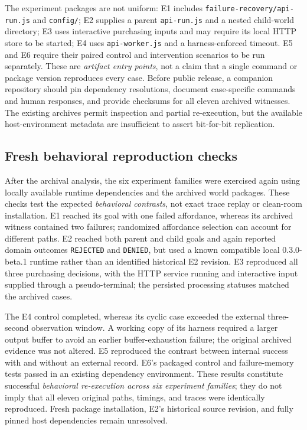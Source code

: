 \documentclass[11pt]{article}
\begin{document}
The experiment packages are not uniform: E1 includes \texttt{failure-recovery/api-run.js} and \texttt{config/}; E2 supplies a parent \texttt{api-run.js} and a nested child-world directory; E3 uses interactive purchasing inputs and may require its local HTTP store to be started; E4 uses \texttt{api-worker.js} and a harness-enforced timeout. E5 and E6 require their paired control and intervention scenarios to be run separately. These are \emph{artifact entry points}, not a claim that a single command or package version reproduces every case. Before public release, a companion repository should pin dependency resolutions, document case-specific commands and human responses, and provide checksums for all eleven archived witnesses. The existing archives permit inspection and partial re-execution, but the available host-environment metadata are insufficient to assert bit-for-bit replication.

\subsection{Fresh behavioral reproduction checks}
After the archival analysis, the six experiment families were exercised again using locally available runtime dependencies and the archived world packages. These checks test the expected \emph{behavioral contrasts}, not exact trace replay or clean-room installation. E1 reached its goal with one failed affordance, whereas its archived witness contained two failures; randomized affordance selection can account for different paths. E2 reached both parent and child goals and again reported domain outcomes \texttt{REJECTED} and \texttt{DENIED}, but used a known compatible local 0.3.0-beta.1 runtime rather than an identified historical E2 revision. E3 reproduced all three purchasing decisions, with the HTTP service running and interactive input supplied through a pseudo-terminal; the persisted processing statuses matched the archived cases.

The E4 control completed, whereas its cyclic case exceeded the external three-second observation window. A working copy of its harness required a larger output buffer to avoid an earlier buffer-exhaustion failure; the original archived evidence was not altered. E5 reproduced the contrast between internal success with and without an external record. E6's packaged control and failure-memory tests passed in an existing dependency environment. These results constitute successful \emph{behavioral re-execution across six experiment families}; they do not imply that all eleven original paths, timings, and traces were identically reproduced. Fresh package installation, E2's historical source revision, and fully pinned host dependencies remain unresolved.
\end{document}
